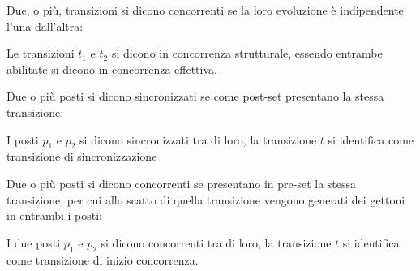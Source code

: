 \documentclass{article}
\numberwithin{equation}{subsection}
\begin{document}
Due, o più, transizioni si dicono concorrenti se la loro evoluzione è indipendente l'una dall'altra:
\begin{center}
\end{center}
Le transizioni $t_1$ e $t_2$ si dicono in concorrenza strutturale, essendo entrambe abilitate si dicono in concorrenza effettiva. 



Due o più posti si dicono sincronizzati se come post-set presentano la stessa transizione:
\begin{center}
\end{center}
I posti $p_1$ e $p_2$ si dicono sincronizzati tra di loro, la transizione $t$ si identifica come transizione di sincronizzazione


Due o più posti si dicono concorrenti se presentano in pre-set la stessa transizione, per cui allo scatto di quella transizione vengono generati dei gettoni in entrambi i posti:
\begin{center}
\end{center}
I due posti $p_1$ e $p_2$ si dicono concorrenti tra di loro, la transizione $t$ si identifica come transizione di inizio concorrenza. 
\end{document}
